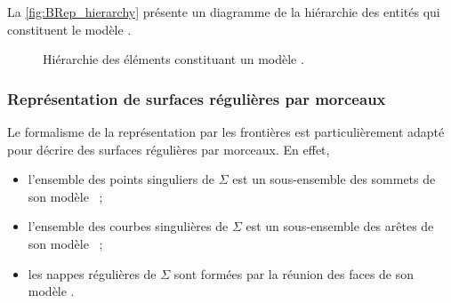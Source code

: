 La \autoref{fig:BRep_hierarchy} présente un diagramme de la hiérarchie des entités qui constituent le modèle \brep.
\begin{figure}
	\centering
	
	\caption{Hiérarchie des éléments constituant un modèle \brep.}
	\label{fig:BRep_hierarchy}
\end{figure}


\subsubsection{Représentation de surfaces régulières par morceaux}
Le formalisme de la représentation par les frontières est particulièrement adapté pour décrire des surfaces régulières par morceaux. 
En effet, 
\begin{itemize}
	\item l'ensemble des points singuliers de $\Sigma$ est un sous-ensemble des sommets de son modèle \brep\ ;
	\item l'ensemble des courbes singulières de $\Sigma$ est un sous-ensemble des arêtes de son modèle \brep\ ;
	\item les nappes régulières de $\Sigma$ sont formées par la réunion des faces de son modèle \brep.
\end{itemize}












